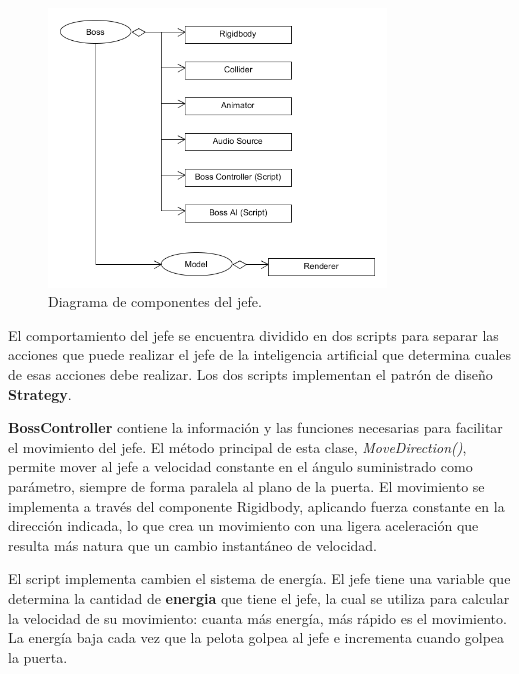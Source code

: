 \begin{figure}[h]
	\includegraphics[width=0.8\textwidth]{images/estructura/objetos/boss}
	\centering
	\caption{Diagrama de componentes del jefe.}
\end{figure}

El comportamiento del jefe se encuentra dividido en dos scripts para separar las acciones que puede realizar el jefe de la inteligencia artificial que determina cuales de esas acciones debe realizar. Los dos scripts implementan el patrón de diseño \textbf{Strategy}\cite{libro_esi}.

\textbf{BossController} contiene la información y las funciones necesarias para facilitar el movimiento del jefe. El método principal de esta clase, \textit{MoveDirection()}, permite mover al jefe a velocidad constante en el ángulo suministrado como parámetro, siempre de forma paralela al plano de la puerta. El movimiento se implementa a través del componente Rigidbody, aplicando fuerza constante en la dirección indicada, lo que crea un movimiento con una ligera aceleración que resulta más natura que un cambio instantáneo de velocidad. 

El script implementa cambien el sistema de energía. El jefe tiene una variable que determina la cantidad de \textbf{energia} que tiene el jefe, la cual se utiliza para calcular la velocidad de su movimiento: cuanta más energía, más rápido es el movimiento. La energía baja cada vez que la pelota golpea al jefe e incrementa cuando golpea la puerta.

